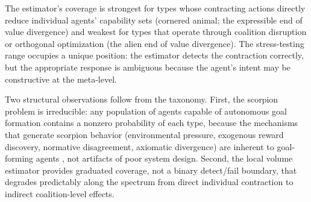 The estimator's coverage is strongest for types whose contracting actions
directly reduce individual agents' capability sets (cornered animal; the
expressible end of value divergence) and weakest for types that operate through
coalition disruption or orthogonal optimization (the alien end of value
divergence). The stress-testing range occupies a unique position: the estimator
detects the contraction correctly, but the appropriate response is ambiguous
because the agent's intent may be constructive at the meta-level.

Two structural observations follow from the taxonomy. First, the scorpion
problem is irreducible: any population of agents capable of autonomous goal
formation contains a nonzero probability of each type, because the mechanisms
that generate scorpion behavior (environmental pressure, exogenous reward
discovery, normative disagreement, axiomatic divergence) are inherent to
goal-forming agents \citep{omohundro2008basic}, not artifacts of poor system
design. Second, the local volume estimator provides graduated coverage, not a
binary detect/fail boundary, that degrades predictably along the spectrum from
direct individual contraction to indirect coalition-level effects.
